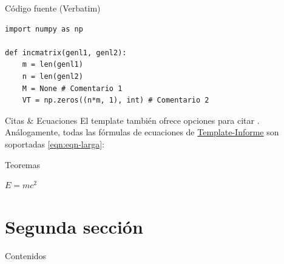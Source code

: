 
\begin{frame}[fragile]{Código fuente (Verbatim)}
	\begin{example}
\begin{verbatim}
import numpy as np

def incmatrix(genl1, genl2):
    m = len(genl1)
    n = len(genl2)
    M = None # Comentario 1
    VT = np.zeros((n*m, 1), int) # Comentario 2
\end{verbatim}
	\end{example}
\end{frame}


\begin{frame}{Citas \& Ecuaciones}
	El template también ofrece opciones para citar \cite{template}. Análogamente, todas las fórmulas de ecuaciones de \href{https://template-latex.github.io/informe}{Template-Informe} son soportadas \eqref{eqn:eqn-larga}:
	
\end{frame}


\begin{frame}{Teoremas}
	\begin{theorem}
		$E = mc^2$
	\end{theorem}
\end{frame}


\section{Segunda sección}

\begin{frame}{Contenidos}
	\tableofcontentscurrent
\end{frame}

